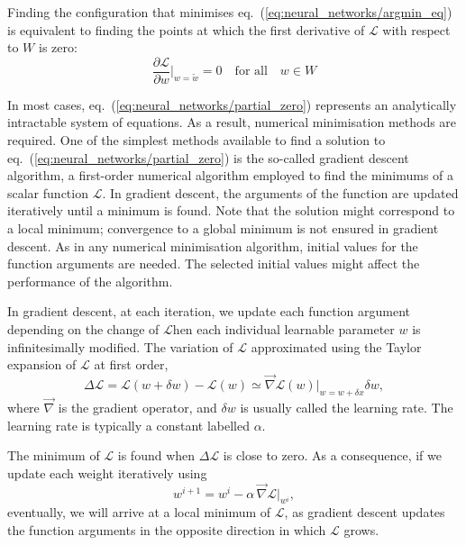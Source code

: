 Finding the configuration that minimises eq.~(\ref{eq:neural_networks/argmin_eq}) is equivalent to
finding the points at which the first derivative of $\mathcal{L}$ with respect to $W$ is zero:
\begin{equation}
    \frac{\partial \mathcal{L}}{\partial w}\bigg|_{w = \tilde{w}} = 0
        \quad \text{for all}\quad w \in W
    \label{eq:neural_networks/partial_zero}
\end{equation}

In most cases, eq.~(\ref{eq:neural_networks/partial_zero}) represents an analytically intractable
system of equations. As a result, numerical minimisation methods are required. One of the simplest
methods available to find a solution to eq.~(\ref{eq:neural_networks/partial_zero}) is the so-called
gradient descent algorithm, a first-order numerical algorithm employed to find the minimums of a
scalar function $\mathcal{L}$. In gradient descent, the arguments of the function are updated
iteratively until a minimum is found. Note that the solution might correspond to a local minimum;
convergence to a global minimum is not ensured in gradient descent. As in any numerical minimisation
algorithm, initial values for the function arguments are needed. The selected initial values might
affect the performance of the algorithm.

In gradient descent, at each iteration, we update each function argument depending on the change of
$\mathcal{L}$hen each individual learnable parameter $w$ is infinitesimally modified. The variation
of $\mathcal{L}$ approximated using the Taylor expansion of $\mathcal{L}$ at first order,
\begin{equation}
    \Delta \mathcal{L} = \mathcal{L}(w + \delta w) - \mathcal{L}(w) \simeq
        \vec{\nabla}\mathcal{L}(w)\big|_{w = w + \delta x} \delta w,
    \label{eq:neural_networks/variation}
\end{equation} 
where $\vec{\nabla}$ is the gradient operator, and $\delta w$ is usually called the learning rate.
The learning rate is typically a constant labelled $\alpha$.
  
The minimum of $\mathcal{L}$ is found when $\Delta \mathcal{L}$ is close to zero. As a consequence,
if we update each weight iteratively using
\begin{equation}
    w^{i + 1} = w^{i} - \alpha\, \vec{\nabla} \mathcal{L}\big|_{w^{i}},
    \label{eq:neural_networks/gradient_descent}
\end{equation} 
eventually, we will arrive at a local minimum of $\mathcal{L}$, as gradient descent updates the
function arguments in the opposite direction in which $\mathcal{L}$ grows.

